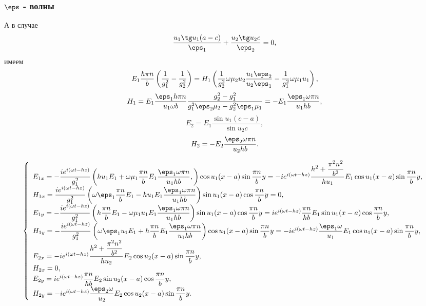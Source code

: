 \subsubsection{\(\boldsymbol{\eps}\) - волны}
А в случае
\[
    \frac{u_1\tg u_1 (a-c)}{\eps_1} + \frac{u_2\tg u_2 c}{\eps_2} = 0,
\]
имеем
\[
    E_1\frac{h\pi n}{b}\left(\frac{1}{g_1^2}-\frac{1}{g_2^2}\right)=
    H_1\left(\frac{1}{g_2^2}\omega\mu_2u_2\frac{u_1\eps_2}{u_2\eps_1}-
    \frac{1}{g_1^2}\omega\mu_1u_1\right),
\]
\[
    H_1 = E_1\frac{\eps_1h\pi n}{u_1\omega b}
    \frac{g_2^2-g_1^2}{g_1^2\eps_2\mu_2 - g_2^2\eps_1\mu_1} =
    -E_1\frac{\eps_1\omega\pi n}{u_1hb},
\]
\[
    E_2 = E_1\frac{\sin u_1(c-a)}{\sin u_2 c},
\]
\[
    H_2 = -E_2\frac{\eps_2\omega\pi n}{u_2hb}.
\]

\[
    \left\{
    \begin{array}{l}
        E_{1x} = -\frac{i e^{i(\omega t - h z)}}{g_1^2}
        \left(h u_1 E_1 +
        \omega\mu_1\frac{\pi n}{b}E_1\frac{\eps_1\omega\pi n}{u_1hb},\right)
        \cos u_1 (x-a) \sin \frac{\pi n}{b}y =-i e^{i(\omega t - h z)}
        \frac{h^2 + \frac{\pi^2 n^2}{b^2}}
        {hu_1}E_1\cos u_1 (x-a) \sin \frac{\pi n}{b}y,\\
        H_{1x} = \frac{i e^{i(\omega t - h z)}}{g_1^2}
        \left(\omega\eps_1\frac{\pi n}{b}E_1-
        h u_1 E_1\frac{\eps_1\omega\pi n}{u_1hb}\right)
        \sin u_1 (x-a) \cos \frac{\pi n}{b}y = 0,\\
        E_{1y} = -\frac{i e^{i(\omega t - h z)}}{g_1^2}
        \left(h \frac{\pi n}{b} E_1 -
        \omega\mu_1u_1E_1\frac{\eps_1\omega\pi n}{u_1hb}\right)
        \sin u_1 (x-a) \cos \frac{\pi n}{b}y = i e^{i(\omega t - h z)}
        \frac{\pi n}{hb} E_1\sin u_1 (x-a) \cos \frac{\pi n}{b}y,\\
        H_{1y} = -\frac{i e^{i(\omega t - h z)}}{g_1^2}
        \left(\omega\eps_1u_1E_1+
        h \frac{\pi n}{b} E_1\frac{\eps_1\omega\pi n}{u_1hb}\right)
        \cos u_1 (x-a) \sin \frac{\pi n}{b}y = -i e^{i(\omega t - h z)}
        \frac{\eps_1\omega}{u_1}E_1\cos u_1 (x-a) \sin \frac{\pi n}{b}y,\\
        E_{2x} = -i e^{i(\omega t - h z)}\frac{h^2 + \frac{\pi^2 n^2}{b^2}}
        {hu_2}E_2\cos u_2 (x-a) \sin \frac{\pi n}{b}y,\\
        H_{2x} = 0,\\
        E_{2y} = i e^{i(\omega t - h z)}\frac{\pi n}{hb}
        E_2\sin u_2 (x-a) \cos \frac{\pi n}{b}y,\\
        H_{2y} = -i e^{i(\omega t - h z)} \frac{\eps_2\omega}{u_2}
        E_2\cos u_2 (x-a) \sin \frac{\pi n}{b}y.\\
    \end{array}
    \right.
\]
